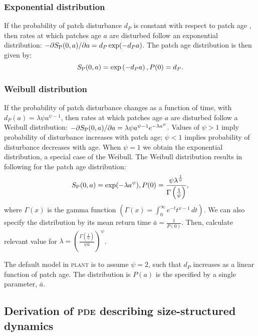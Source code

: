\documentclass[10pt,twoside]{article}
\newcommand{\plant}{\textsc{plant}}
\begin{document}
\subsubsection{Exponential distribution}\label{exponential-distribution}

If the probability of patch disturbance \(d_P\) is constant with respect to
patch age , then rates at which patches age \(a\) are
disturbed follow an exponential distribution:
\(-\partial S_{\rm P}(0, a)/ \partial a = d_P \exp(-d_P a)\). The patch age
distribution is then given by:
\[ S_{\rm P}(0, a) = \exp\left(-d_P a\right), P(0) = d_P.\]

\subsubsection{Weibull distribution}\label{weibull-distribution}

If the probability of patch disturbance changes as a function of time,
with \(d_P(a) = \lambda \psi a^{\psi-1}\), then rates at which
patches age \(a\) are disturbed follow a Weibull distribution:
\(-\partial S_{\rm P}(0, a)/ \partial a = \lambda \psi a^{\psi -1}e^{-\lambda a^\psi}\).
Values of \(\psi>1\) imply probability of disturbance increases with
patch age; \(\psi<1\) implies probability of disturbance decreases with
age. When \(\psi = 1\) we obtain the exponential distribution, a special
case of the Weibull. The Weibull distribution results in following for
the patch age distribution:
\[S_{\rm P}(0, a) = \exp(-\lambda a^\psi), P(0) = \frac{\psi \lambda^{\frac1{\psi}}}{\Gamma\left(\frac1{\psi}\right)},\]
where \(\Gamma(x)\) is the gamma function
\(\left(\Gamma(x) = \int_{0}^{\infty}e^{-t}t^{x-1} \, dt\right)\). We can
also specify the distribution by its mean return time
\(\bar{a} = \frac1{P(0)}\). Then, calculate relevant value for
\(\lambda = \left(\frac{\Gamma\left(\frac1{\psi}\right)}{\psi \bar{a}}\right)^{\psi}\).

The default model in {\plant} is to assume $\psi=2$, such that \(d_P\) increases as
a linear function of patch age. The distribution is $P(a)$ is the specified by a
single parameter, $\bar{a}$.


\subsection{Derivation of \textsc{pde} describing size-structured
dynamics}\label{derivation-of-pde-describing-size-structured-dynamics}
\end{document}
